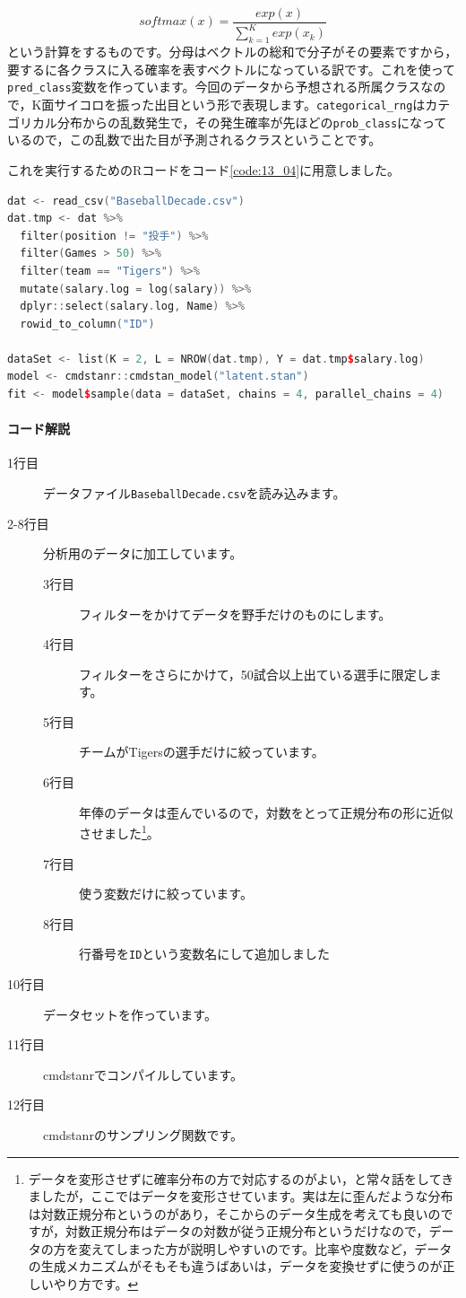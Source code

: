 \documentclass{ltjsbook}
\begin{document}
\begin{description}
	      \[ softmax(x) = \frac{exp(x)}{\sum_{k=1}^K exp(x_k)}\]
	      という計算をするものです。分母はベクトルの総和で分子がその要素ですから，要するに各クラスに入る確率を表すベクトルになっている訳です。これを使って\verb|pred_class|変数を作っています。今回のデータから予想される所属クラスなので，K面サイコロを振った出目という形で表現します。\verb|categorical_rng|はカテゴリカル分布からの乱数発生で，その発生確率が先ほどの\verb|prob_class|になっているので，この乱数で出た目が予測されるクラスということです。
\end{description}
これを実行するためのRコードをコード\ref{code:13_04}に用意しました。
\begin{lstlisting}[language=c++,label={code:13_04},caption={混合分布モデルのコード}]
dat <- read_csv("BaseballDecade.csv")
dat.tmp <- dat %>%
  filter(position != "投手") %>%
  filter(Games > 50) %>%
  filter(team == "Tigers") %>%
  mutate(salary.log = log(salary)) %>%
  dplyr::select(salary.log, Name) %>%
  rowid_to_column("ID")

dataSet <- list(K = 2, L = NROW(dat.tmp), Y = dat.tmp$salary.log)
model <- cmdstanr::cmdstan_model("latent.stan")
fit <- model$sample(data = dataSet, chains = 4, parallel_chains = 4)
\end{lstlisting}

\paragraph{コード解説}
\begin{description}
	\item[1行目] データファイル\verb|BaseballDecade.csv|を読み込みます。
	\item[2-8行目] 分析用のデータに加工しています。
	      \begin{description}
		      \item[3行目] フィルターをかけてデータを野手だけのものにします。
		      \item[4行目] フィルターをさらにかけて，50試合以上出ている選手に限定します。
		      \item[5行目] チームがTigersの選手だけに絞っています。
		      \item[6行目] 年俸のデータは歪んでいるので，対数をとって正規分布の形に近似させました\footnote{データを変形させずに確率分布の方で対応するのがよい，と常々話をしてきましたが，ここではデータを変形させています。実は左に歪んだような分布は対数正規分布というのがあり，そこからのデータ生成を考えても良いのですが，対数正規分布はデータの対数が従う正規分布というだけなので，データの方を変えてしまった方が説明しやすいのです。比率や度数など，データの生成メカニズムがそもそも違うばあいは，データを変換せずに使うのが正しいやり方です。}。
		      \item[7行目] 使う変数だけに絞っています。
		      \item[8行目] 行番号を\verb|ID|という変数名にして追加しました
	      \end{description}
	\item[10行目] データセットを作っています。
	\item[11行目] cmdstanrでコンパイルしています。
	\item[12行目] cmdstanrのサンプリング関数です。
\end{description}
\end{document}
